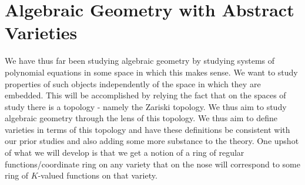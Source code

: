 \section{Algebraic Geometry with Abstract Varieties}
We have thus far been studying algebraic geometry by studying systems of polynomial equations in some space in which this makes sense. We want to study properties of such objects independently of the space in which they are embedded. This will be accomplished by relying the fact that on the spaces of study there is a topology - namely the Zariski topology. We thus aim to study algebraic geometry through the lens of this topology. We thus aim to define varieties in terms of this topology and have these definitions be consistent with our prior studies and also adding some more substance to the theory. One upshot of what we will develop is that we get a notion of a ring of regular functions/coordinate ring on any variety that on the nose will correspond to some ring of $K$-valued functions on that variety.  
